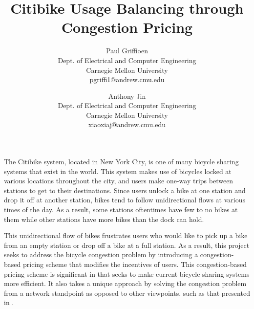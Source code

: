 \documentclass[times, 10pt,twocolumn]{article}
\begin{document}
\title{Citibike Usage Balancing through Congestion Pricing}

\author{Paul Griffioen\\Dept. of Electrical and Computer Engineering\\Carnegie Mellon University\\ pgriffi1@andrew.cmu.edu\\
\and
Anthony Jin\\Dept. of Electrical and Computer Engineering\\Carnegie Mellon University\\xiaoxiaj@andrew.cmu.edu\\
}

\maketitle
\thispagestyle{empty}


The Citibike system, located in New York City, is one of many bicycle sharing systems that exist in the world. This system makes use of bicycles locked at various locations throughout the city, and users make one-way trips between stations to get to their destinations. Since users unlock a bike at one station and drop it off at another station, bikes tend to follow unidirectional flows at various times of the day. As a result, some stations oftentimes have few to no bikes at them while other stations have more bikes than the dock can hold.

This unidirectional flow of bikes frustrates users who would like to pick up a bike from an empty station or drop off a bike at a full station. As a result, this project seeks to address the bicycle congestion problem by introducing a congestion-based pricing scheme that modifies the incentives of users. This congestion-based pricing scheme is significant in that seeks to make current bicycle sharing systems more efficient. It also takes a unique approach by solving the congestion problem from a network standpoint as opposed to other viewpoints, such as that presented in \cite{incentives}.

\end{document}
